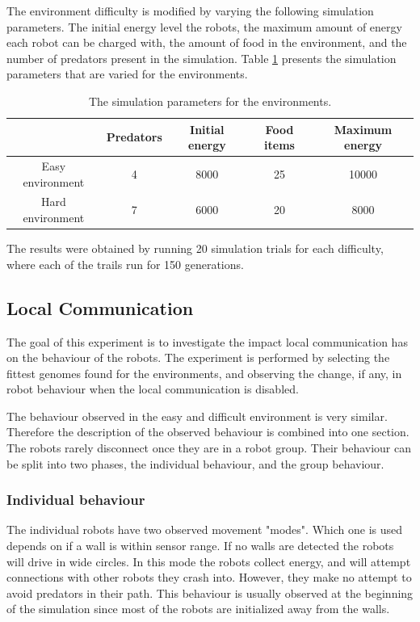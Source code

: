 The environment difficulty is modified by varying the following simulation parameters.
The initial energy level the robots, the maximum amount of energy each robot can be charged with, the amount of food in the environment, and the number of predators present in the simulation.
Table \ref{tab:environment-difficulty} presents the simulation parameters that are varied for the environments.

\begin{table}[H]
	\centering

	\begin{tabular}{|c|c|c|c|c|}
		\hline  & \small{Predators} & \small{Initial energy} & \small{Food items} & \small{Maximum energy} \\ 
		\hline \small{Easy environment} & 4 & 8000 & 25 & 10000 \\ 
		\hline \small{Hard environment} & 7 & 6000 & 20 &8000 \\ 
		\hline 
		
	\end{tabular} 
	\caption{The simulation parameters for the environments.}
	\label{tab:environment-difficulty}
\end{table}

The results were obtained by running 20 simulation trials for each difficulty, where each of the trails run for 150 generations.

\newpage
\pagestyle{plain}



\newpage
\pagestyle{main}

\subsection{Local Communication}
\label{sec:local_communication}
The goal of this experiment is to investigate the impact local communication has on the behaviour of the robots.
The experiment is performed by selecting the fittest genomes found for the environments, and observing the change, if any, in robot behaviour when the local communication is disabled.


The behaviour observed in the easy and difficult environment is very similar.
Therefore the description of the observed behaviour is combined into one section.
The robots rarely disconnect once they are in a robot group.
Their behaviour can be split into two phases, the individual behaviour, and the group behaviour.

\subsubsection{Individual behaviour}
\label{sec:invdividual_behaviour}
The individual robots have two observed movement "modes".
Which one is used depends on if a wall is within sensor range.
If no walls are detected the robots will drive in wide circles.
In this mode the robots collect energy, and will attempt connections with other robots they crash into.
However, they make no attempt to avoid predators in their path.
This behaviour is usually observed at the beginning of the simulation since most of the robots are initialized away from the walls.


